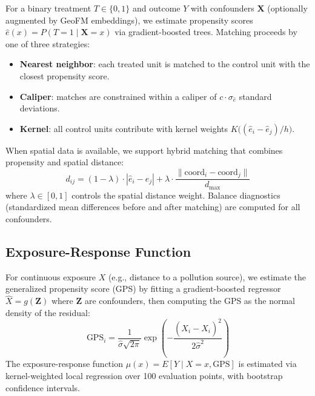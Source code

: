 \documentclass{article}
\begin{document}
For a binary treatment $T \in \{0,1\}$ and outcome $Y$ with confounders $\mathbf{X}$ (optionally augmented by GeoFM embeddings), we estimate propensity scores $\hat{e}(x) = P(T=1 \mid \mathbf{X}=x)$ via gradient-boosted trees. Matching proceeds by one of three strategies:

\begin{itemize}
\item \textbf{Nearest neighbor}: each treated unit is matched to the control unit with the closest propensity score.
\item \textbf{Caliper}: matches are constrained within a caliper of $c \cdot \sigma_{\hat{e}}$ standard deviations.
\item \textbf{Kernel}: all control units contribute with kernel weights $K\big((\hat{e}_i - \hat{e}_j)/h\big)$.
\end{itemize}

When spatial data is available, we support hybrid matching that combines propensity and spatial distance:
\begin{equation}
d_{ij} = (1 - \lambda) \cdot |\hat{e}_i - \hat{e}_j| + \lambda \cdot \frac{\|\text{coord}_i - \text{coord}_j\|}{d_{\max}}
\end{equation}
where $\lambda \in [0,1]$ controls the spatial distance weight. Balance diagnostics (standardized mean differences before and after matching) are computed for all confounders.

\subsection{Exposure-Response Function}

For continuous exposure $X$ (e.g., distance to a pollution source), we estimate the generalized propensity score (GPS) by fitting a gradient-boosted regressor $\hat{X} = g(\mathbf{Z})$ where $\mathbf{Z}$ are confounders, then computing the GPS as the normal density of the residual:
\begin{equation}
\text{GPS}_i = \frac{1}{\hat{\sigma}\sqrt{2\pi}} \exp\left(-\frac{(X_i - \hat{X}_i)^2}{2\hat{\sigma}^2}\right)
\end{equation}
The exposure-response function $\mu(x) = E[Y \mid X = x, \text{GPS}]$ is estimated via kernel-weighted local regression over 100 evaluation points, with bootstrap confidence intervals.
\end{document}
